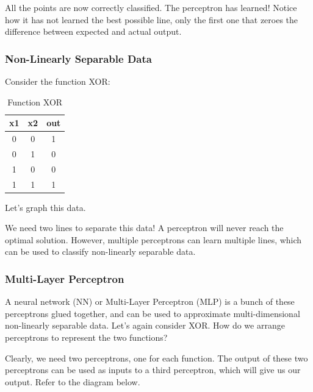 All the points are now correctly classified. The perceptron has learned! Notice how it has not learned the best possible line, only the first one that zeroes the difference between expected and actual output.
\subsubsection{Non-Linearly Separable Data}
Consider the function XOR:

\begin{table}[H]
	\centering
	\begin{tabular}{ |c|c|c| } 
		\hline
		x1 & x2 & out \\
		\hline
		0 & 0 & 1 \\ 
		0 & 1 & 0 \\ 
		1 & 0 & 0 \\ 
		1 & 1 & 1 \\ 
		\hline
	\end{tabular}
	\caption{Function XOR}
	\label{t:xor}
\end{table}
Let's graph this data.
\begin{center}
\end{center}

We need two lines to separate this data! A perceptron will never reach the optimal solution. However, multiple perceptrons can learn multiple lines, which can be used to classify non-linearly separable data.

\subsubsection{Multi-Layer Perceptron}
A neural network (NN) or Multi-Layer Perceptron (MLP) is a bunch of these perceptrons glued together, and can be used to approximate multi-dimensional non-linearly separable data.
Let's again consider XOR. How do we arrange perceptrons to represent the two functions?

Clearly, we need two perceptrons, one for each function. The output of these two perceptrons can be used as inputs to a third perceptron, which will give us our output. Refer to the diagram below.

